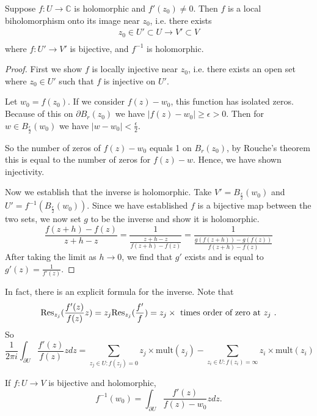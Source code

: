 \documentclass{article}
\begin{document}
\begin{lem}{}{}
Suppose \( f: U \to \mathbb{C}  \) is holomorphic and \( f'(z_0)\neq  0\). Then \( f \) is a local biholomorphism onto its image near \( z_0 \), i.e. there exists
\begin{align*}
    z_0 \in U' \subset U \to  V' \subset V\\
\end{align*}
where \( f: U' \to V' \) is bijective, and \( f^{-1}  \) is holomorphic. 

\tcbline

\begin{proof}

First we show \( f \) is locally injective near \( z_0 \), i.e. there exists an open set where \(z_0 \in  U'  \)  such that \( f \) is injective on \( U' \). 

Let \( w_0 = f(z_0) \). If we consider \( f(z) - w_0 \), this function has isolated zeros. Because of this on \( \partial B_{r} (z_0) \) we have \( |f(z) - w_0| \geq \epsilon > 0 \). Then for \( w \in B_\frac{\epsilon }{2}(w_0) \) we have \( |w - w_0| < \frac{\epsilon}{2}\). 

So the number of zeros of \( f(z) - w_0 \) equals 1 on \( B_{r} (z_0) \), by Rouche's theorem this is equal to the number of zeros for \( f(z) - w \). Hence, we have shown injectivity. 

Now we establish that the inverse is holomorphic. Take \( V' = B_{\frac{\epsilon}{2}}(w_0) \) and \( U' = f^{-1} ( B_{\frac{\epsilon}{2}}(w_0)) \). Since we have established \( f \) is a bijective map between the two sets, we now set \( g \) to be the inverse and show it is holomorphic. 
\[
    \frac{f(z + h) - f(z)}{z + h - z} = \frac{1}{\frac{z + h - z}{f(z + h)- f(z)} }  = \frac{1}{\frac{g(f(z + h)) - g(f(z))}{f(z + h)- f(z)}  }
\]
After taking the limit as \( h\to 0 \), we find that \( g' \) exists and is equal to \( g'(z) = \frac{1}{f'(z)} \). 
\end{proof}

In fact, there is an explicit formula for the inverse. Note that
\[
    \mathrm{Res}_{z_j}(\frac{f'(z)}{f(z)}z ) = z_j \mathrm{Res} _{z_j}(\frac{f'}{f} ) = z_{j} \times \text{ times order of zero at \( z_{j}  \) }.
\]
So 
\[
    \frac{1}{2\pi i}\int _{\partial U} \frac{f'(z)}{f(z)}z  dz = \sum_{z_{j}\in U : f(z_{j} ) = 0 } z_{j} \times \mathrm{mult}(z_{j} )  -  \sum_{z_{i}\in U : f(z_{i} ) = \infty  } z_{i} \times \mathrm{mult}(z_{i} )
\]

If \( f:U \to V \) is bijective and holomorphic,
\[
    f^{-1} (w_0) = \int _{\partial U} \frac{f'(z)}{f(z)- w_0}z dz. 
\]
\end{lem}
\end{document}
